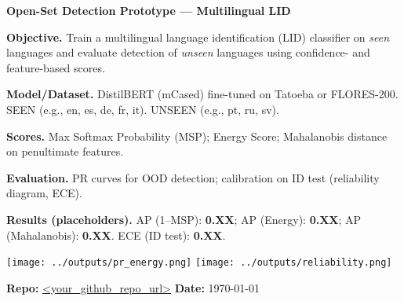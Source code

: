 \documentclass[10pt,a4paper]{article}
\begin{document}
\textbf{Open-Set Detection Prototype --- Multilingual LID}

\textbf{Objective.} Train a multilingual language identification (LID) classifier on \emph{seen} languages and evaluate detection of \emph{unseen} languages using confidence- and feature-based scores.

\textbf{Model/Dataset.} DistilBERT (mCased) fine-tuned on Tatoeba or FLORES-200. SEEN (e.g., en, es, de, fr, it). UNSEEN (e.g., pt, ru, sv).

\textbf{Scores.} Max Softmax Probability (MSP); Energy Score; Mahalanobis distance on penultimate features.

\textbf{Evaluation.} PR curves for OOD detection; calibration on ID test (reliability diagram, ECE).

\textbf{Results (placeholders).} AP (1--MSP): \textbf{0.XX}; AP (Energy): \textbf{0.XX}; AP (Mahalanobis): \textbf{0.XX}. ECE (ID test): \textbf{0.XX}.

\begin{center}
\texttt{[image: ../outputs/pr\_energy.png]}
\hfill
\texttt{[image: ../outputs/reliability.png]}
\end{center}

\noindent \textbf{Repo:} \url{<your\_github\_repo\_url>} \hfill \textbf{Date:} \today
\end{document}
